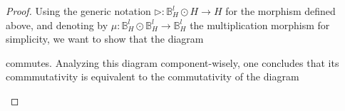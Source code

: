 \documentclass[a4paper,11pt,reqno]{amsart}
\numberwithin{equation}{section}
\theoremstyle{remark}
\theoremstyle{definition}
\newcommand{\bB}{\mathbb B}
\newcommand{\cC}{\mathcal C}
\newcommand{\id}{\mathrm{id}}
\newcommand{\Hilb}{\mathrm{Hilb}}
\begin{document}
\begin{proof}
    Using the generic notation $\triangleright: \bB^l_H \odot H \to H$ for the morphism defined above, and denoting by $\mu: \bB^l_H \odot \bB^l_H \to \bB^l_H$ the multiplication morphism for simplicity, we want to show that the diagram
    \begin{center}
    \end{center}
    commutes. Analyzing this diagram component-wisely, one concludes that its commmutativity is equivalent to the commutativity of the diagram
    \begin{center}
\end{center}
\end{proof}
\end{document}
